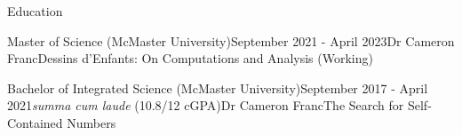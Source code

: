 \begin{rSection}{Education}

\begin{edSubsectionMin}{Master of Science (McMaster University)}{September 2021 - April 2023}{Dr Cameron Franc}{Dessins d'Enfants: On Computations and Analysis (Working)}
\end{edSubsectionMin}



\begin{edSubsectionHonours}{Bachelor of Integrated Science (McMaster University)}{September 2017 - April 2021}{{\em summa cum laude} (10.8/12 cGPA)}{Dr Cameron Franc}{The Search for Self-Contained Numbers}
\end{edSubsectionHonours}




\end{rSection}
